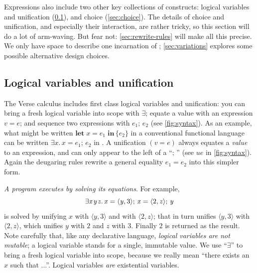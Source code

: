 \documentclass[acmsmall,review,anonymous,dvipsnames]{acmart}
\newcommand{\Varid}[1]{\mathit{#1}}
\begin{document}
Expressions also include two other key collections of constructs:
logical variables and unification (\cref{sec:unify}), and choice (\cref{sec:choice}).
The details of choice and unification, and especially their
interaction, are rather tricky, so this section will do a lot of
arm-waving.  But fear not: \cref{sec:rewrite-rules} will make all this
precise.  We only have space to describe one incarnation of \versecalc{}; \cref{sec:variations}
explores some possible alternative design choices.

\subsection{Logical variables and unification} \label{sec:unify}

The Verse calculus includes first class logical variables and unification:
you can bring a fresh logical variable into scope with \ensuremath{\exists}; equate a value with an expression
\ensuremath{\Varid{v}=\Varid{e}}; and sequence two expressions with \ensuremath{\Varid{e}_{\mathrm{1}};\,\Varid{e}_{\mathrm{2}}} (see \cref{fig:syntax}).
As an example, what might be written \ensuremath{\textbf{let}\;\Varid{x}=\Varid{e}_{\mathrm{1}}\;\textbf{in}\,\{\Varid{e}_{\mathrm{2}}\}} in a conventional functional language can be written
\ensuremath{\exists\Varid{x}.\,\Varid{x}\mathrel{=}\Varid{e}_{\mathrm{1}};\,\Varid{e}_{\mathrm{2}}} in \versecalc{}.  A unification \ensuremath{(\Varid{v}\mathrel{=}\Varid{e})} always equates a \emph{value} to an expression,
and can only appear to the left of a ``\ensuremath{;\,}'' (see \ensuremath{\Varid{ue}} in \cref{fig:syntax}).
Again the deugaring rules rewrite a general equality \ensuremath{\Varid{e}_{\mathrm{1}}=\Varid{e}_{\mathrm{2}}} into this simpler form.

\emph{A program executes by solving its equations}.
For example,
$$
\ensuremath{\exists\Varid{x}\hspace{0.3mm}\Varid{y}\hspace{0.3mm}\Varid{z}.\,\Varid{x}\mathrel{=}\langle{}\Varid{y},\mathrm{3}\rangle;\,\Varid{x}\mathrel{=}\langle{}\mathrm{2},\Varid{z}\rangle;\,\Varid{y}}
$$
is solved by unifying \ensuremath{\Varid{x}} with \ensuremath{\langle{}\Varid{y},\mathrm{3}\rangle} and with \ensuremath{\langle{}\mathrm{2},\Varid{z}\rangle}; that in turn unifies \ensuremath{\langle{}\Varid{y},\mathrm{3}\rangle} with \ensuremath{\langle{}\mathrm{2},\Varid{z}\rangle}, which
unifies \ensuremath{\Varid{y}} with \ensuremath{\mathrm{2}} and \ensuremath{\Varid{z}} with \ensuremath{\mathrm{3}}.  Finally \ensuremath{\mathrm{2}} is returned as the result.
Note carefully that, like any declarative language,
\emph{logical variables are not mutable}; a logical variable stands for a single, immutable value.
We use ``\ensuremath{\exists}'' to bring a fresh logical variable into scope, because we really
mean ``there exists an \ensuremath{\Varid{x}} such that ...''.  Logical variables \emph{are} existential variables.
\end{document}
